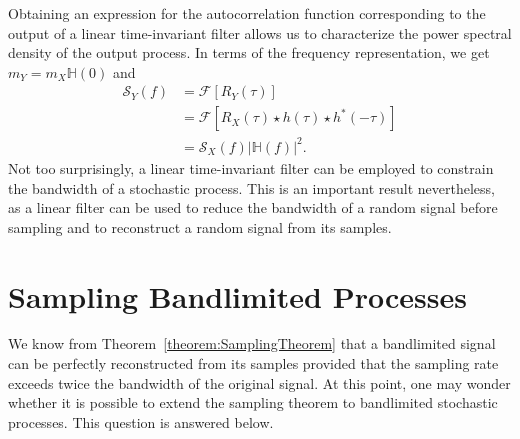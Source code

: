 Obtaining an expression for the autocorrelation function corresponding to the output of a linear time-invariant filter allows us to characterize the power spectral density of the output process.
In terms of the frequency representation, we get $m_Y = m_X \mathbb{H}(0)$ and
\begin{equation*}
\begin{split}
\mathcal{S}_Y (f) &= \mathcal{F} [ R_Y (\tau) ] \\
&= \mathcal{F} \left[ R_X (\tau) \star h(\tau) \star h^*(-\tau) \right] \\
&= \mathcal{S}_X(f) |\mathbb{H}(f)|^2 .
\end{split}
\end{equation*}
Not too surprisingly, a linear time-invariant filter can be employed to constrain the bandwidth of a stochastic process.
This is an important result nevertheless, as a linear filter can be used to reduce the bandwidth of a random signal before sampling and to reconstruct a random signal from its samples.


\section{Sampling Bandlimited Processes}

We know from Theorem~\ref{theorem:SamplingTheorem} that a bandlimited signal can be perfectly reconstructed from its samples provided that the sampling rate exceeds twice the bandwidth of the original signal.
At this point, one may wonder whether it is possible to extend the sampling theorem to bandlimited stochastic processes.
This question is answered below.

